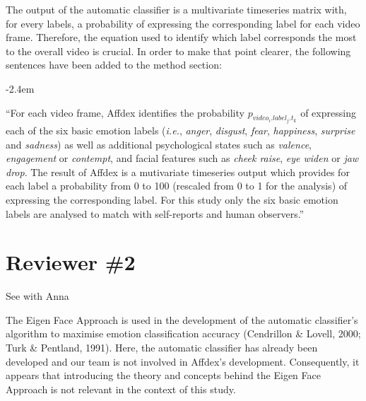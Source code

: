 \documentclass[]{article}
\renewenvironment{quote}{\begin{fquote}\advance\leftmargini -2.4em\begin{oldquote}}{\end{oldquote}\end{fquote}}
\newenvironment{fquote}
  {\def\FrameCommand{
	\fboxsep=0.6em %
	\fcolorbox{black}{white}}%
    \MakeFramed {\advance\hsize-2\width \FrameRestore}
    \begin{minipage}{\linewidth}
  }
  {\end{minipage}\endMakeFramed}
\begin{document}
The output of the automatic classifier is a multivariate timeseries matrix with, for every labels, a probability of expressing the corresponding label for each video frame. Therefore, the equation used to identify which label corresponds the most to the overall video is crucial. In order to make that point clearer, the following sentences have been added to the method section:

\begin{quote}
``For each video frame, Affdex identifies the probability \(p_{video_{i}.label_{j}.t_{k}}\) of expressing each of the six basic emotion labels (\emph{i.e.}, \emph{anger}, \emph{disgust}, \emph{fear}, \emph{happiness}, \emph{surprise} and \emph{sadness}) as well as additional psychological states such as \emph{valence}, \emph{engagement} or \emph{contempt}, and facial features such as \emph{cheek raise}, \emph{eye widen} or \emph{jaw drop}. The result of Affdex is a mutivariate timeseries output which provides for each label a probability from 0 to 100 (rescaled from 0 to 1 for the analysis) of expressing the corresponding label. For this study only the six basic emotion labels are analysed to match with self-reports and human observers.''
\end{quote}

\hypertarget{reviewer-2}{%
\section{Reviewer \#2}\label{reviewer-2}}


See with Anna


The Eigen Face Approach is used in the development of the automatic classifier's algorithm to maximise emotion classification accuracy (Cendrillon \& Lovell, 2000; Turk \& Pentland, 1991). Here, the automatic classifier has already been developed and our team is not involved in Affdex's development. Consequently, it appears that introducing the theory and concepts behind the Eigen Face Approach is not relevant in the context of this study.

\end{document}
